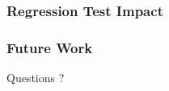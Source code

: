 \documentclass{beamer}
\begin{document}
\begin{frame}\frametitle{Regression Test Impact}
%
\end{frame}


\begin{frame}\frametitle{Future Work}
\end{frame}


\begin{frame}
\vspace*{\fill}
\begin{center}
\huge{Questions ?}
\end{center}
\vspace*{\fill}
\end{frame}
\end{document}
